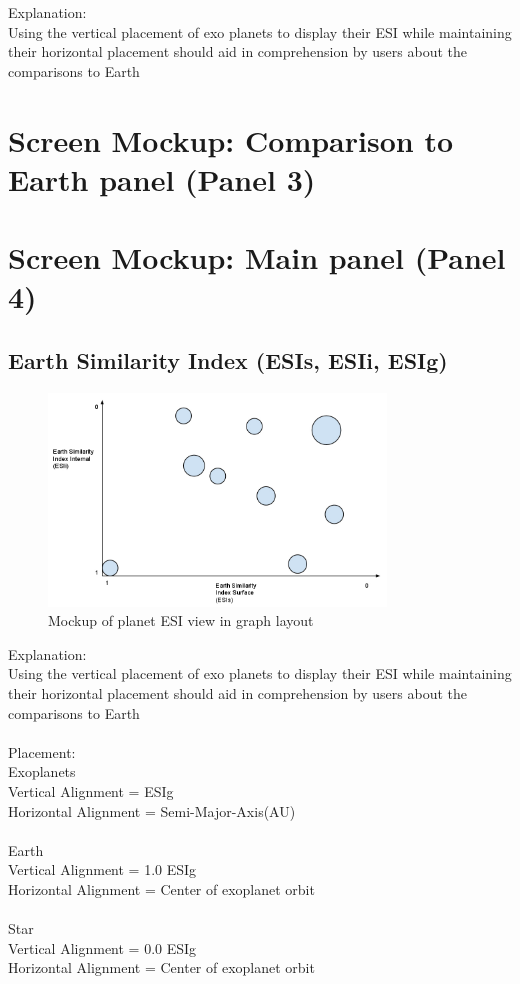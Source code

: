 \documentclass[11pt
              , a4paper
              , twoside
              , openright
              ]{report}
\begin{document}
Explanation:
\\
Using the vertical placement of exo planets to display their ESI while maintaining their horizontal placement should aid in comprehension by users about the comparisons to Earth
\section{Screen Mockup: Comparison to Earth panel (Panel 3)}
\section{Screen Mockup: Main panel (Panel 4)}
\subsection{Earth Similarity Index (ESIs, ESIi, ESIg) }
\begin{figure}[H]
  \centering
      \includegraphics[width=0.8\textwidth]{images/esi_mock.jpg}
  \caption{Mockup of planet ESI view in graph layout}
\end{figure}
Explanation:\\
Using the vertical placement of exo planets to display their ESI while maintaining their horizontal placement should aid in comprehension by users about the comparisons to Earth
\\\\
Placement:\\
Exoplanets\\
Vertical Alignment = ESIg\\
Horizontal Alignment = Semi-Major-Axis(AU)
\\\\
Earth\\
Vertical Alignment = 1.0 ESIg\\
Horizontal Alignment = Center of exoplanet orbit
\\\\
Star\\
Vertical Alignment = 0.0 ESIg\\
Horizontal Alignment =  Center of exoplanet orbit
\end{document}
